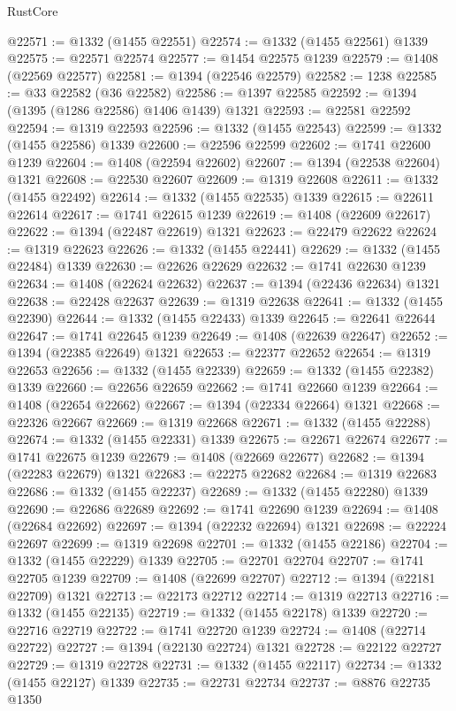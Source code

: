 \begin{lexlean}{RustCore}
\begin{coremodule}
@22571 := @1332 (@1455 @22551)
@22574 := @1332 (@1455 @22561) @1339
@22575 := @22571 @22574
@22577 := @1454 @22575 @1239
@22579 := @1408 (@22569 @22577)
@22581 := @1394 (@22546 @22579)
@22582 := 1238
@22585 := @33 @22582 (@36 @22582)
@22586 := @1397 @22585
@22592 := @1394 (@1395 (@1286 @22586) @1406 @1439) @1321
@22593 := @22581 @22592
@22594 := @1319 @22593
@22596 := @1332 (@1455 @22543)
@22599 := @1332 (@1455 @22586) @1339
@22600 := @22596 @22599
@22602 := @1741 @22600 @1239
@22604 := @1408 (@22594 @22602)
@22607 := @1394 (@22538 @22604) @1321
@22608 := @22530 @22607
@22609 := @1319 @22608
@22611 := @1332 (@1455 @22492)
@22614 := @1332 (@1455 @22535) @1339
@22615 := @22611 @22614
@22617 := @1741 @22615 @1239
@22619 := @1408 (@22609 @22617)
@22622 := @1394 (@22487 @22619) @1321
@22623 := @22479 @22622
@22624 := @1319 @22623
@22626 := @1332 (@1455 @22441)
@22629 := @1332 (@1455 @22484) @1339
@22630 := @22626 @22629
@22632 := @1741 @22630 @1239
@22634 := @1408 (@22624 @22632)
@22637 := @1394 (@22436 @22634) @1321
@22638 := @22428 @22637
@22639 := @1319 @22638
@22641 := @1332 (@1455 @22390)
@22644 := @1332 (@1455 @22433) @1339
@22645 := @22641 @22644
@22647 := @1741 @22645 @1239
@22649 := @1408 (@22639 @22647)
@22652 := @1394 (@22385 @22649) @1321
@22653 := @22377 @22652
@22654 := @1319 @22653
@22656 := @1332 (@1455 @22339)
@22659 := @1332 (@1455 @22382) @1339
@22660 := @22656 @22659
@22662 := @1741 @22660 @1239
@22664 := @1408 (@22654 @22662)
@22667 := @1394 (@22334 @22664) @1321
@22668 := @22326 @22667
@22669 := @1319 @22668
@22671 := @1332 (@1455 @22288)
@22674 := @1332 (@1455 @22331) @1339
@22675 := @22671 @22674
@22677 := @1741 @22675 @1239
@22679 := @1408 (@22669 @22677)
@22682 := @1394 (@22283 @22679) @1321
@22683 := @22275 @22682
@22684 := @1319 @22683
@22686 := @1332 (@1455 @22237)
@22689 := @1332 (@1455 @22280) @1339
@22690 := @22686 @22689
@22692 := @1741 @22690 @1239
@22694 := @1408 (@22684 @22692)
@22697 := @1394 (@22232 @22694) @1321
@22698 := @22224 @22697
@22699 := @1319 @22698
@22701 := @1332 (@1455 @22186)
@22704 := @1332 (@1455 @22229) @1339
@22705 := @22701 @22704
@22707 := @1741 @22705 @1239
@22709 := @1408 (@22699 @22707)
@22712 := @1394 (@22181 @22709) @1321
@22713 := @22173 @22712
@22714 := @1319 @22713
@22716 := @1332 (@1455 @22135)
@22719 := @1332 (@1455 @22178) @1339
@22720 := @22716 @22719
@22722 := @1741 @22720 @1239
@22724 := @1408 (@22714 @22722)
@22727 := @1394 (@22130 @22724) @1321
@22728 := @22122 @22727
@22729 := @1319 @22728
@22731 := @1332 (@1455 @22117)
@22734 := @1332 (@1455 @22127) @1339
@22735 := @22731 @22734
@22737 := @8876 @22735 @1350

\end{coremodule}
\end{lexlean}
